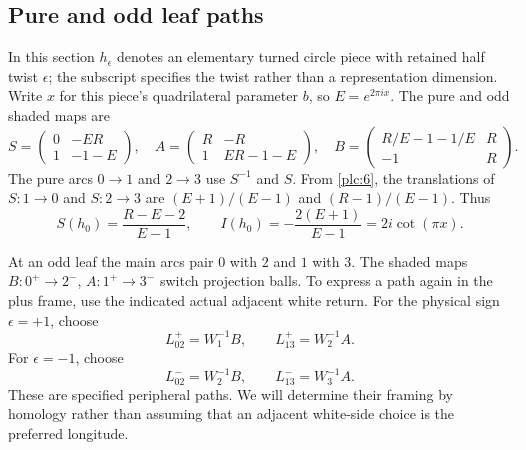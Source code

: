 \subsection{Pure and odd leaf paths}\label{pure-and-odd-leaf-paths}

In this section $h_\epsilon$ denotes an elementary turned circle
piece with retained half twist $\epsilon$; the subscript specifies
the twist rather than a representation dimension. Write $x$ for
this piece's quadrilateral parameter $b$, so $E=e^{2\pi i x}$.
The pure and odd shaded maps are \begin{equation}
S=\begin{pmatrix}0&-ER\\1&-1-E\end{pmatrix},\quad
 A=\begin{pmatrix}R&-R\\1&ER-1-E\end{pmatrix},\quad
 B=\begin{pmatrix}R/E-1-1/E&R\\-1&R\end{pmatrix}.
\label{plc:24}
\end{equation} The pure arcs \(0\to1\) and \(2\to3\) use \(S^{-1}\) and \(S\). From
\eqref{plc:6}, the translations of \(S:1\to0\) and \(S:2\to3\) are \((E+1)/(E-1)\)
and \((R-1)/(E-1)\). Thus \begin{equation}
S(h_0)=\frac{R-E-2}{E-1},\qquad
 I(h_0)=-\frac{2(E+1)}{E-1}=2i\cot(\pi x).
\label{plc:25}
\end{equation}

At an odd leaf the main arcs pair \(0\) with \(2\) and \(1\) with \(3\).
The shaded maps \(B:0^+\to2^-\), \(A:1^+\to3^-\) switch projection
balls. To express a path again in the plus frame, use the indicated
actual adjacent white return. For the physical sign \(\epsilon=+1\),
choose \begin{equation}
L_{02}^{+}=W_1^{-1}B,\qquad L_{13}^{+}=W_2^{-1}A.
\label{plc:26}
\end{equation} For \(\epsilon=-1\), choose \begin{equation}
L_{02}^{-}=W_2^{-1}B,\qquad L_{13}^{-}=W_3^{-1}A.
\label{plc:27}
\end{equation} These are specified peripheral paths. We will determine their framing
by homology rather than assuming that an adjacent white-side choice is
the preferred longitude.

